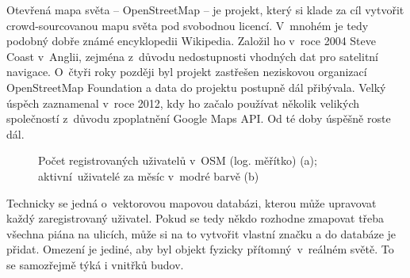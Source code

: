 Otevřená mapa světa -- OpenStreetMap -- je projekt, který si klade za cíl vytvořit crowd-sourcovanou mapu světa pod svobodnou licencí. V~mnohém je tedy podobný dobře známé encyklopedii Wikipedia. Založil ho v~roce 2004 Steve Coast v~Anglii, zejména z~důvodu nedostupnosti vhodných dat pro satelitní navigace. O~čtyři roky později byl projekt zastřešen neziskovou organizací OpenStreetMap Foundation a data do projektu postupně dál přibývala. Velký úspěch zaznamenal v~roce 2012, kdy ho začalo používat několik velikých společností z~důvodu zpoplatnění Google Maps API. Od té doby úspěšně roste dál.


                      \begin{figure}
                    
                    \hfill

                    \caption{Počet registrovaných uživatelů v~OSM (log. měřítko) (a); aktivní~uživatelé za měsíc v~modré barvě (b)\cite{zdroj39}}
                    \label{obr21}
                    \end{figure}
                    

Technicky se jedná o~vektorovou mapovou databázi, kterou může upravovat každý zaregistrovaný uživatel. Pokud se tedy někdo rozhodne zmapovat třeba všechna piána na ulicích, může si na to vytvořit vlastní značku a do databáze je přidat. Omezení je jediné, aby byl objekt fyzicky přítomný~v~reálném světě. To se samozřejmě týká i vnitřků budov.

